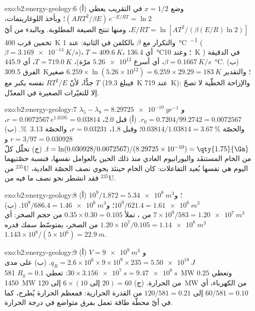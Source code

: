 \begin{solution}{exo:b2:energy-geology:6}
(أ) وضع $x = 1/2$ في التقريب يعطي $(ART^2/\beta E)\,e^{-E/RT} = \ln 2$؛ وبأخذ اللوغاريتمات،
$E/RT = \ln[AT^2/(\beta(E/R)\ln 2)]$، ومنها تنتج الصيغة المطلوبة. وبالبدء من أيّ تخمين قرب
\qty{400}{K} والتكرار مع $\beta$ بالكلفن في الثانية: عند \qty{1}{\celsius\per\Myr}
($\beta = \qty{3.169e-14}{K/s}$)، $T = \qty{409.6}{K}$، أي \qty{136.4}{\celsius}؛ وعند \qty{10}{K} في
الدقيقة ($\beta = \qty{0.1667}{K/s}$، أي أسرع $\num{5.26e12}$ مرّة)، $T = \qty{719.0}{K}$، أي
\qty{445.9}{\celsius}. (ب) الفرق \qty{309.5}{K}؛ والتقدير $6.259 \times
\ln(5.26 \times 10^{12}) = 6.259 \times 29.29 = \qty{183}{K}$ صغير جدًّا، لأنّ $RT^2/E$
نفسه يكبر مع $T$ (فيبلغ \qty{19.3}{K} عند \qty{719}{K}): والإزاحة الخطّية لا تصحّ إلا للتغيّرات
الصغيرة في المعدّل.
\end{solution}

\begin{solution}{exo:b2:energy-geology:7}
$\lambda_5 - \lambda_8 = \qty{8.29725e-10}{yr^{-1}}$ و$r_0 = 0.7204/99.2742 = 0.0072567$.
(أ) قبل \qty{2.0}{\Ga}، $r = 0.0072567\,e^{1.6595} = 0.03814$، والحصّة $0.03814/1.03814 =
\qty{3.67}{\percent}$؛ وقبل \qty{1.8}{\Ga}، $r = 0.03231$، والحصّة \qty{3.13}{\percent}. (ب) $r =
3/97 = 0.030928$ و$t = \ln(0.030928/0.0072567)/(8.29725 \times 10^{-10}) = \qty{1.75}{\Ga}$.
(ج) تحلّل كلّ من الخام المستنفَد واليورانيوم العادي منذ ذلك الحين بالعوامل نفسها، فنسبة
حصّتيهما من $^{235}$U اليوم هي نفسها بُعيد التفاعلات: كان الخام حينئذ يحوي نصف
الحصّة العادية، فقد انشطر نحو نصف ما فيه من $^{235}$U.
\end{solution}

\begin{solution}{exo:b2:energy-geology:8}
(أ) $10^9/1.872 = \qty{5.34e8}{m^3}$؛ و$10^9/621.4 = \qty{1.61e6}{m^3}$؛ و$10^9/686.4 =
\qty{1.46e6}{m^3}$. (ب) $7 \times 10^9/583 = \qty{1.20e7}{m^3}$ من ، تملأ
$0.35 \times 0.30 = 0.105$ من حجم الصخر: أي $1.20 \times 10^7/0.105 = \qty{1.14e8}{m^3}$ من الصخر،
بمتوسّط سمك قدره $1.143 \times 10^8/(5 \times 10^6) = \qty{22.9}{m}$.
\end{solution}

\begin{solution}{exo:b2:energy-geology:9}
(أ) $V = \qty{9e9}{m^3}$ و$q_R = 2.6 \times 10^6 \times 9 \times 10^9 \times 235 =
\qty{5.50e18}{J}$. (ب) على مدى $30 \times \qty{3.156e7}{s} = \qty{9.47e8}{s}$: تعطي $R_g = 0.1$
\qty{581}{MW} وتعطي $0.25$ \qty{1450}{MW} من الحرارة. (ج) $6 \times (10 \text{ إلى } 20) = 60$ إلى
\qty{120}{MW} من الكهرباء، أي $60/581 = 0.10$ إلى $120/581 = 0.21$ من القدرة الحرارية: فمعظم
الحرارة يُطرح، كما في أيّ محطّة طاقة تعمل بفرق متواضع في درجة الحرارة.
\end{solution}

